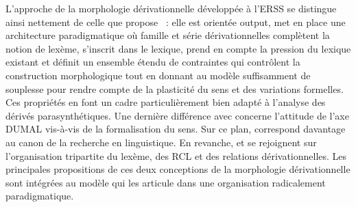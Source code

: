 \documentclass[output=paper]{langsci/langscibook}
\begin{document}
L'approche de la morphologie dérivationnelle développée à l'ERSS se distingue ainsi nettement de celle que propose \cite{Fradin03}~: elle est orientée output, met en place une architecture paradigmatique où famille et série dérivationnelles complètent la notion de lexème, s'inscrit dans le lexique, prend en compte la pression du lexique existant et définit un ensemble étendu de contraintes qui contrôlent la construction morphologique tout en donnant au modèle suffisamment de  souplesse pour rendre compte de la plasticité du sens et des variations formelles.  Ces propriétés en font un cadre particulièrement bien adapté à l'analyse des dérivés parasynthétiques.
Une dernière différence avec \cite{Fradin03} concerne l'attitude de l'axe DUMAL vis-à-vis de la formalisation du sens. Sur ce plan, \cite{Fradin03} correspond davantage au canon de la recherche en linguistique.
En revanche, \cite{Fradin03} et \cite{roche2011.dumal} se rejoignent sur l'organisation tripartite du lexème, des RCL et des relations dérivationnelles. Les principales propositions de ces deux conceptions de la morphologie dérivationnelle sont intégrées au modèle \paradis{} qui les articule dans une organisation radicalement paradigmatique.





\end{document}
